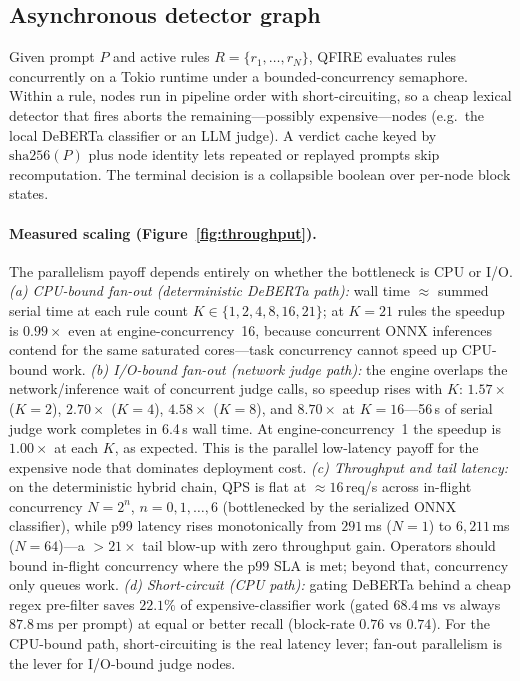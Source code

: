 \documentclass[11pt]{article}
\begin{document}
\subsection{Asynchronous detector graph}
Given prompt $P$ and active rules $R=\{r_1,\dots,r_N\}$, QFIRE evaluates rules
concurrently on a Tokio runtime under a bounded-concurrency semaphore. Within a
rule, nodes run in pipeline order with short-circuiting, so a cheap lexical
detector that fires aborts the remaining---possibly expensive---nodes (e.g.\ the
local DeBERTa classifier or an LLM judge). A verdict cache keyed by
$\mathrm{sha256}(P)$ plus node identity lets repeated or replayed prompts skip
recomputation. The terminal decision is a collapsible boolean over per-node block
states.

\paragraph{Measured scaling (Figure~\ref{fig:throughput}).}
The parallelism payoff depends entirely on whether the bottleneck is CPU or I/O.
\emph{(a) CPU-bound fan-out (deterministic DeBERTa path):} wall time $\approx$
summed serial time at each rule count $K\in\{1,2,4,8,16,21\}$; at $K{=}21$ rules the speedup is
$0.99\times$ even at engine-concurrency~16, because concurrent ONNX inferences
contend for the same saturated cores---task concurrency cannot speed up
CPU-bound work.
\emph{(b) I/O-bound fan-out (network judge path):} the engine overlaps the
network/inference wait of concurrent judge calls, so speedup rises with $K$:
$1.57\times$ ($K{=}2$), $2.70\times$ ($K{=}4$), $4.58\times$ ($K{=}8$), and
$\mathbf{8.70\times}$ at $K{=}16$---56\,s of serial judge work completes in 6.4\,s
wall time. At engine-concurrency~1 the speedup is $1.00\times$ at each $K$, as
expected. This is the parallel low-latency payoff for the expensive node that
dominates deployment cost.
\emph{(c) Throughput and tail latency:} on the deterministic hybrid chain, QPS is
flat at ${\approx}16$\,req/s across in-flight concurrency $N{=}2^{n}$, $n{=}0,1,\dots,6$
(bottlenecked by the serialized ONNX classifier), while p99 latency rises
monotonically from $291$\,ms ($N{=}1$) to $6{,}211$\,ms ($N{=}64$)---a $>21\times$
tail blow-up with zero throughput gain. Operators should bound in-flight
concurrency where the p99 SLA is met; beyond that, concurrency only queues work.
\emph{(d) Short-circuit (CPU path):} gating DeBERTa behind a cheap regex
pre-filter saves $22.1\%$ of expensive-classifier work (gated $68.4$\,ms vs
always $87.8$\,ms per prompt) at equal or better recall (block-rate $0.76$ vs
$0.74$). For the CPU-bound path, short-circuiting is the real latency lever;
fan-out parallelism is the lever for I/O-bound judge nodes.
\end{document}
